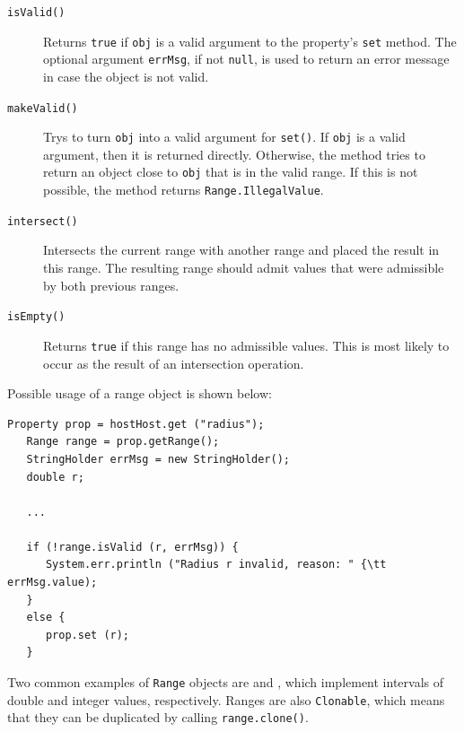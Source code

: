 \begin{description}

\item[{\tt isValid()} ] \mbox{}

Returns {\tt true} if {\tt obj} is a valid
argument to the property's {\tt set} method. The optional
argument {\tt errMsg}, if not {\tt null}, is used to return
an error message in case the object is not valid.

\item[{\tt makeValid()} ] \mbox{}

Trys to turn {\tt obj} into a valid argument for {\tt set()}. If
{\tt obj} is a valid argument, then it is returned directly. Otherwise,
the method tries to return an object close to {\tt obj} that is in the
valid range. If this is not possible, the method returns
{\tt Range.IllegalValue}.

\item[{\tt intersect()} ] \mbox{}

Intersects the current range with another range and
placed the result in this range. The resulting range should admit values
that were admissible by both previous ranges.

\item[{\tt isEmpty()} ] \mbox{}

Returns {\tt true} if this range has no admissible values.
This is most likely to occur as the result of an intersection
operation.

\end{description}

Possible usage of a range object is shown below:

\begin{lstlisting}[]
   Property prop = hostHost.get ("radius");
   Range range = prop.getRange();
   StringHolder errMsg = new StringHolder();
   double r;

   ...

   if (!range.isValid (r, errMsg)) {
      System.err.println ("Radius r invalid, reason: " {\tt  errMsg.value);
   }
   else {
      prop.set (r);
   }
\end{lstlisting}

Two common examples of {\tt Range} objects are 
 and
, 
which implement intervals of double and integer
values, respectively.  Ranges are also {\tt Clonable}, which means that
they can be duplicated by calling {\tt range.clone()}.

